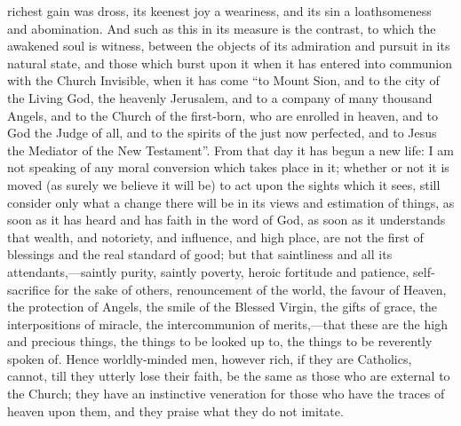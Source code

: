 richest gain was dross, its keenest joy a weariness, and its sin a
loathsomeness and abomination. And such as this in its measure is the
contrast, to which the awakened soul is witness, between the objects
of its admiration and pursuit in its natural state, and those which
burst upon it when it has entered into communion with the Church
Invisible, when it has come ``to Mount Sion, and to the city of
the Living God, the heavenly Jerusalem, and to a company of many
thousand Angels, and to the Church of the first-born, who are enrolled
in heaven, and to God the Judge of all, and to the spirits of the just
now perfected, and to Jesus the Mediator of the New Testament''.
From that day it has begun a new life: I am not speaking of any moral
conversion which takes place in it; whether or not it is moved (as
surely we believe it will be) to act upon the sights which it sees,
still consider only what a change there will be in its views and
estimation of things, as soon as it has heard and has faith in the
word of God, as soon as it understands that wealth, and notoriety, and
influence, and high place, are not the first of blessings and the real
standard of good; but that saintliness and all its attendants,—saintly
purity, saintly poverty, heroic fortitude and patience, self-sacrifice
for the sake of others, renouncement of the world, the favour of
Heaven, the protection of Angels, the smile of the Blessed Virgin, the
gifts of grace, the interpositions of miracle, the intercommunion of
merits,—that these are the high and precious things, the things to
be looked up to, the things to be reverently spoken of. Hence
worldly-minded men, however rich, if they are Catholics, cannot, till
they utterly lose their faith, be the same as those who are external
to the Church; they have an instinctive veneration for those who have
the traces of heaven upon them, and they praise what they do not
imitate.

